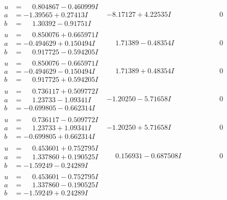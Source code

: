 \documentclass[1p]{elsarticle_modified}
\theoremstyle{definition}
\begin{document}
$$\begin{array}{c|c|c}
\begin{aligned}
u &= \phantom{-}0.804867 - 0.460999 I \\
a &= -1.39565 + 0.27413 I \\
b &= \phantom{-}1.30392 - 0.91751 I\end{aligned}
 & -8.17127 + 4.22535 I & \phantom{-0.000000 } 0 \\ \hline\begin{aligned}
u &= \phantom{-}0.850076 + 0.665971 I \\
a &= -0.494629 + 0.150494 I \\
b &= \phantom{-}0.917725 - 0.594205 I\end{aligned}
 & \phantom{-}1.71389 - 0.48354 I & \phantom{-0.000000 } 0 \\ \hline\begin{aligned}
u &= \phantom{-}0.850076 - 0.665971 I \\
a &= -0.494629 - 0.150494 I \\
b &= \phantom{-}0.917725 + 0.594205 I\end{aligned}
 & \phantom{-}1.71389 + 0.48354 I & \phantom{-0.000000 } 0 \\ \hline\begin{aligned}
u &= \phantom{-}0.736117 + 0.509772 I \\
a &= \phantom{-}1.23733 - 1.09341 I \\
b &= -0.699805 - 0.662314 I\end{aligned}
 & -1.20250 - 5.71658 I & \phantom{-0.000000 } 0 \\ \hline\begin{aligned}
u &= \phantom{-}0.736117 - 0.509772 I \\
a &= \phantom{-}1.23733 + 1.09341 I \\
b &= -0.699805 + 0.662314 I\end{aligned}
 & -1.20250 + 5.71658 I & \phantom{-0.000000 } 0 \\ \hline\begin{aligned}
u &= \phantom{-}0.453601 + 0.752795 I \\
a &= \phantom{-}1.337860 + 0.190525 I \\
b &= -1.59249 - 0.24289 I\end{aligned}
 & \phantom{-}0.156931 - 0.687508 I & \phantom{-0.000000 } 0 \\ \hline\begin{aligned}
u &= \phantom{-}0.453601 - 0.752795 I \\
a &= \phantom{-}1.337860 - 0.190525 I \\
b &= -1.59249 + 0.24289 I\end{aligned}

\end{array}$$
\end{document}
